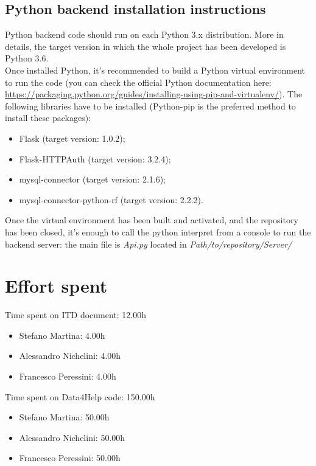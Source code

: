 \documentclass{article}
\begin{document}
\subsection{Python backend installation instructions}
Python backend code should run on each Python 3.x distribution. More in details, the target version in which the whole project has been developed is Python 3.6.\\
Once installed Python, it's recommended to build a Python virtual environment to run the code (you can check the official Python documentation here: \url{https://packaging.python.org/guides/installing-using-pip-and-virtualenv/}). The following libraries have to be installed (Python-pip is the preferred method to install these packages):
\begin{itemize}
	\item Flask (target version: 1.0.2);
	\item Flask-HTTPAuth (target version: 3.2.4);
	\item mysql-connector (target version: 2.1.6);
	\item mysql-connector-python-rf (target version: 2.2.2).
\end{itemize}
Once the virtual environment has been built and activated, and the repository has been closed, it's enough to call the python interpret from a console to run the backend server: the main file is \textit{Api.py} located in \textit{Path/to/repository/Server/} 

\newpage
\section{Effort spent}

Time spent on ITD document: 12.00h
\begin{itemize}
	\item Stefano Martina: 4.00h	
	\item Alessandro Nichelini: 4.00h
	\item Francesco Peressini: 4.00h
\end{itemize}

Time spent on Data4Help code: 150.00h
\begin{itemize}
	\item Stefano Martina: 50.00h
	\item Alessandro Nichelini: 50.00h
	\item Francesco Peressini: 50.00h
\end{itemize}
\end{document}
